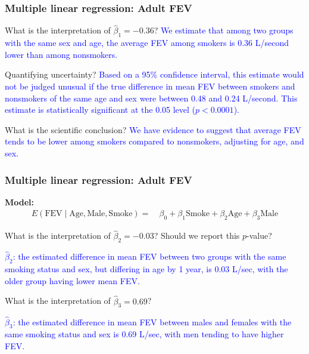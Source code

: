 \documentclass[12pt, 
hyperref={colorlinks=true, linkcolor=blue, urlcolor=cyan}]{beamer}
\begin{document}
\begin{frame}
\frametitle{Multiple linear regression: Adult FEV}

What is the interpretation of $\hat{\beta}_1 = -0.36$? \pause \textcolor{blue}{We estimate that among two groups with the same sex and age, the average FEV among smokers is 0.36 L/second lower than among nonsmokers.}

Quantifying uncertainty? \pause \textcolor{blue}{Based on a 95\% confidence interval, this estimate would not be judged unusual if the true difference in mean FEV between smokers and nonsmokers of the same age and sex were between 0.48 and 0.24 L/second. This estimate is statistically significant at the 0.05 level ($p < 0.0001$).}

What is the scientific conclusion? \pause \textcolor{blue}{We have evidence to suggest that average FEV tends to be lower among smokers compared to nonsmokers, adjusting for age, and sex.}
\end{frame}

\begin{frame}
\frametitle{Multiple linear regression: Adult FEV}
\vspace{-0.5cm}\textbf{Model:} {\small \begin{align*}
E(\text{FEV} \mid \text{Age}, \text{Male}, \text{Smoke}) =& \ \beta_0 + \beta_1 \text{Smoke} + \beta_2 \text{Age} + \beta_3 \text{Male} 
\end{align*} } \vspace{-1cm}

What is the interpretation of $\hat{\beta}_2 = -0.03$? Should we report this $p$-value? \pause

\textcolor{blue}{$\hat{\beta}_2$: the estimated difference in mean FEV between two groups with the same smoking status and sex, but differing in age by 1 year, is 0.03 L/sec, with the older group having lower mean FEV.}

What is the interpretation of $\hat{\beta}_3 = 0.69$? \pause

\textcolor{blue}{$\hat{\beta}_3$: the estimated difference in mean FEV between males and females with the same smoking status and sex is 0.69 L/sec, with men tending to have higher FEV.}

\end{frame}
\end{document}
